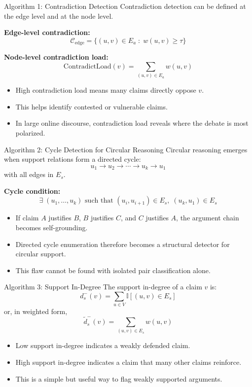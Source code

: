 \documentclass[aspectratio=169, 10pt]{beamer}
\begin{document}
\begin{frame}{Algorithm 1: Contradiction Detection}
Contradiction detection can be defined at the edge level and at the node level.

\textbf{Edge-level contradiction:}
\[
\mathcal{C}_{\text{edge}} = \{(u,v)\in E_a \;:\; w(u,v)\ge \tau\}
\]

\textbf{Node-level contradiction load:}
\[
\mathrm{ContradictLoad}(v) = \sum_{(u,v)\in E_a} w(u,v)
\]

\begin{itemize}
  \item High contradiction load means many claims directly oppose \(v\).
  \item This helps identify contested or vulnerable claims.
  \item In large online discourse, contradiction load reveals where the debate is most polarized.
\end{itemize}
\end{frame}

\begin{frame}{Algorithm 2: Cycle Detection for Circular Reasoning}
Circular reasoning emerges when support relations form a directed cycle:
\[
u_1 \rightarrow u_2 \rightarrow \cdots \rightarrow u_k \rightarrow u_1
\]
with all edges in \(E_s\).

\textbf{Cycle condition:}
\[
\exists \; (u_1,\dots,u_k) \text{ such that } (u_i,u_{i+1})\in E_s,\; (u_k,u_1)\in E_s
\]

\begin{itemize}
  \item If claim \(A\) justifies \(B\), \(B\) justifies \(C\), and \(C\) justifies \(A\), the argument chain becomes self-grounding.
  \item Directed cycle enumeration therefore becomes a structural detector for circular support.
  \item This flaw cannot be found with isolated pair classification alone.
    \end{itemize}
\end{frame}

\begin{frame}{Algorithm 3: Support In-Degree}
The support in-degree of a claim \(v\) is:
\[
d_s^{-}(v) = \sum_{u \in V} \mathbb{I}[(u,v)\in E_s]
\]
or, in weighted form,
\[
\tilde d_s^{-}(v) = \sum_{(u,v)\in E_s} w(u,v)
\]

\begin{itemize}
  \item Low support in-degree indicates a weakly defended claim.
  \item High support in-degree indicates a claim that many other claims reinforce.
  \item This is a simple but useful way to flag weakly supported arguments.
\end{itemize}
\end{frame}
\end{document}
